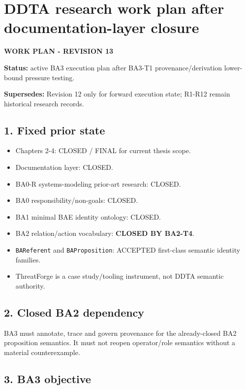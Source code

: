 \documentclass[11pt,a4paper]{article}
\providecommand{\tightlist}{\setlength{\itemsep}{0pt}\setlength{\parskip}{0pt}}
\begin{document}
\section{DDTA research work plan after documentation-layer closure}\label{ddta-research-work-plan-after-documentation-layer-closure}

\textbf{WORK PLAN - REVISION 13}

\textbf{Status:} active BA3 execution plan after BA3-T1 provenance/derivation lower-bound pressure testing.

\textbf{Supersedes:} Revision 12 only for forward execution state; R1-R12 remain historical research records.

\subsection{1. Fixed prior state}\label{1-fixed-prior-state}

\begin{itemize}
\tightlist
\item
  Chapters 2-4: CLOSED / FINAL for current thesis scope.
\item
  Documentation layer: CLOSED.
\item
  BA0-R systems-modeling prior-art research: CLOSED.
\item
  BA0 responsibility/non-goals: CLOSED.
\item
  BA1 minimal BAE identity ontology: CLOSED.
\item
  BA2 relation/action vocabulary: \textbf{CLOSED BY BA2-T4}.
\item
  \texttt{BAReferent} and \texttt{BAProposition}: ACCEPTED first-class semantic identity families.
\item
  ThreatForge is a case study/tooling instrument, not DDTA semantic authority.
\end{itemize}

\subsection{2. Closed BA2 dependency}\label{2-closed-ba2-dependency}

BA3 must annotate, trace and govern provenance for the already-closed BA2 proposition semantics. It must not reopen operator/role semantics without a material counterexample.

\subsection{3. BA3 objective}\label{3-ba3-objective}
\end{document}
